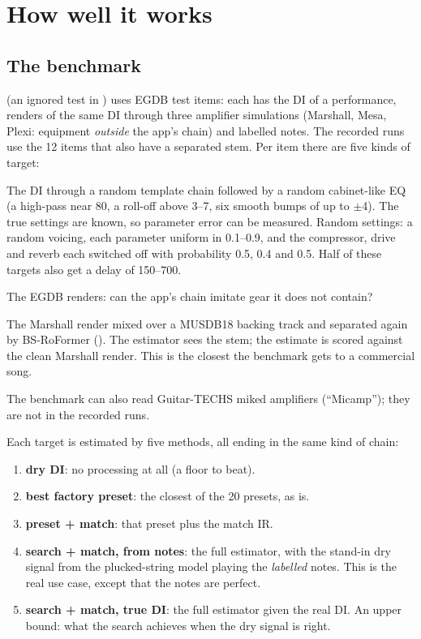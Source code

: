 \section{How well it works}
\label{sec:results}

\subsection{The benchmark}

 (an ignored test in ) uses EGDB test items:
each has the DI of a performance, renders of the same DI through three
amplifier simulations (Marshall, Mesa, Plexi: equipment \emph{outside} the app's
chain) and labelled notes. The recorded runs use the 12 items that also have a
separated stem. Per item there are five kinds of target:
\begin{description}[style=nextline,leftmargin=1.2cm]
\item[chain] The DI through a random template chain followed by a random
  cabinet-like EQ (a high-pass near 80\Hz, a roll-off above 3--7\kHz, six
  smooth bumps of up to $\pm$4\dB). The true settings are known, so parameter
  error can be measured. Random settings: a random voicing, each parameter
  uniform in 0.1--0.9, and the compressor, drive and reverb each switched off
  with probability 0.5, 0.4 and 0.5. Half of these targets also get a delay of
  150--700\ms.
\item[Marshall, Mesa, Plexi] The EGDB renders: can the app's chain imitate gear
  it does not contain?
\item[sep-Marshall] The Marshall render mixed over a MUSDB18 backing track and
  separated again by BS-RoFormer (). The estimator sees the
  stem; the estimate is scored against the clean Marshall render. This is the
  closest the benchmark gets to a commercial song.
\end{description}
The benchmark can also read Guitar-TECHS miked amplifiers (``Micamp''); they are
not in the recorded runs.

Each target is estimated by five methods, all ending in the same kind of chain:
\begin{enumerate}
\item \textbf{dry DI}: no processing at all (a floor to beat).
\item \textbf{best factory preset}: the closest of the 20 presets, as is.
\item \textbf{preset + match}: that preset plus the match IR.
\item \textbf{search + match, from notes}: the full estimator, with the stand-in
  dry signal from the plucked-string model playing the \emph{labelled} notes.
  This is the real use case, except that the notes are perfect.
\item \textbf{search + match, true DI}: the full estimator given the real DI.
  An upper bound: what the search achieves when the dry signal is right.
\end{enumerate}


